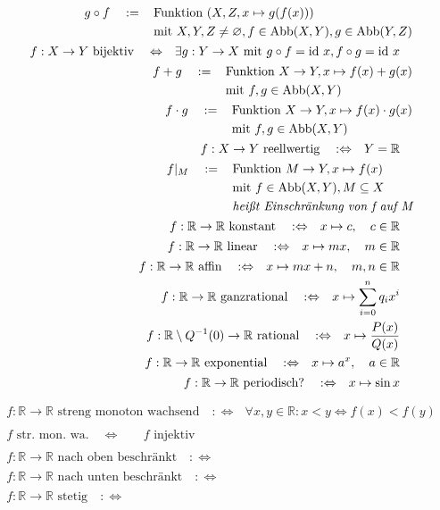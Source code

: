 \documentclass{scrartcl}
\newcommand{\gdw}{\quad :\Leftrightarrow\quad &}
\newcommand{\is}{\quad :=\,\quad &}
\newcommand{\aeq}{\quad \Leftrightarrow\quad &} %
\newcommand{\sse}{\subseteq}
\newcommand{\RR}{\mathbb{R}}
\renewcommand{\r}[1]{\begin{split}#1\end{split} \\}
\begin{document}
\begin{align*}
  \r{
    g \circ f \is \text{Funktion } (X, Z, x \mapsto g(f(x))) \\
    & \text{mit }X, Y, Z \neq \varnothing, f \in \text{Abb}(X, Y), g \in \text{Abb}(Y, Z)
  }\r{
    f:X \to Y \text{ bijektiv} \aeq \exists g:Y\to X \text{ mit } g \circ f = \text{id }x,
    f \circ g = \text{id }x
  }\r{
    f+g \is \text{Funktion } X \to Y, x \mapsto f(x) + g(x) \\&
    \text{mit }f, g \in \text{Abb}(X, Y)
  }\r{
    f\cdot g \is \text{Funktion } X \to Y, x \mapsto f(x) \cdot g(x) \\&
    \text{mit }f, g \in \text{Abb}(X, Y)
  }\r{
    f : X \to Y \text{ reellwertig} \gdw Y = \RR
  }\r{
    f|_M \is \text{Funktion } M \to Y, x \mapsto f(x) \\&
    \text{mit }f \in \text{Abb}(X, Y), M \sse X \\&
    \emph{heißt Einschränkung von f auf M}
  }\r{
    f:\RR \to \RR \text{ konstant} \gdw x \mapsto c, \quad c \in \RR 
  }\r{
    f:\RR \to \RR \text{ linear} \gdw x \mapsto mx, \quad m \in \RR 
  }\r{
    f:\RR \to \RR \text{ affin} \gdw x \mapsto mx+n, \quad m, n \in \RR 
  }\r{
    f:\RR \to \RR \text{ ganzrational} \gdw x \mapsto \sum^{n}_{i=0}{q_ix^i}
  }\r{
    f:\RR\setminus Q^{-1}(0) \to \RR \text{ rational} \gdw x \mapsto \frac{P(x)}{Q(x)}
  }\r{
    f:\RR \to \RR \text{ exponential} \gdw x \mapsto a^x, \quad a \in \RR 
  }\r{
    f:\RR \to \RR \text{ periodisch?} \gdw x \mapsto \sin x
  }
\end{align*}
\begin{align*}
  \r{
    f : \RR \to \RR \text{ streng monoton wachsend} \gdw \forall x, y \in \RR :
    x < y \Leftrightarrow f(x) < f(y)
  }\r{
    f \text{ str. mon. wa.} \aeq f \text{ injektiv}
  }\r{
    f : \RR \to \RR \text{ nach oben beschränkt} \gdw
  }\r{
    f : \RR \to \RR \text{ nach unten beschränkt} \gdw
  }\r{
    f : \RR \to \RR \text{ stetig} \gdw
  }
\end{align*}
\end{document}
